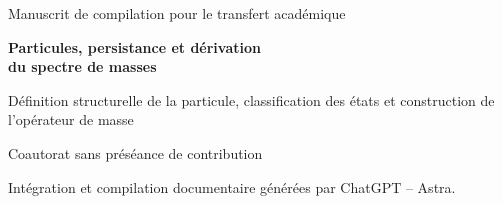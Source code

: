\thispagestyle{plain}
\begin{center}
{\fontsize{10}{12}\selectfont Manuscrit de compilation pour le transfert académique\par}
\vspace{5mm}
{\fontsize{17}{20.5}\selectfont\bfseries Particules, persistance et dérivation\\
du spectre de masses
\par}
\vspace{6pt}
{\fontsize{11}{13.5}\selectfont Définition structurelle de la particule, classification des états et construction de l’opérateur de masse
\par}
\vspace{11pt}
{\fontsize{11.5}{14}\selectfont\Autores\par}
\vspace{4pt}
{\fontsize{8}{10}\selectfont Coautorat sans préséance de contribution\par}
\vspace{3pt}
{\fontsize{7.5}{9.5}\selectfont Intégration et compilation documentaire générées par ChatGPT -- Astra.\par}
\end{center}
\vspace{7pt}
